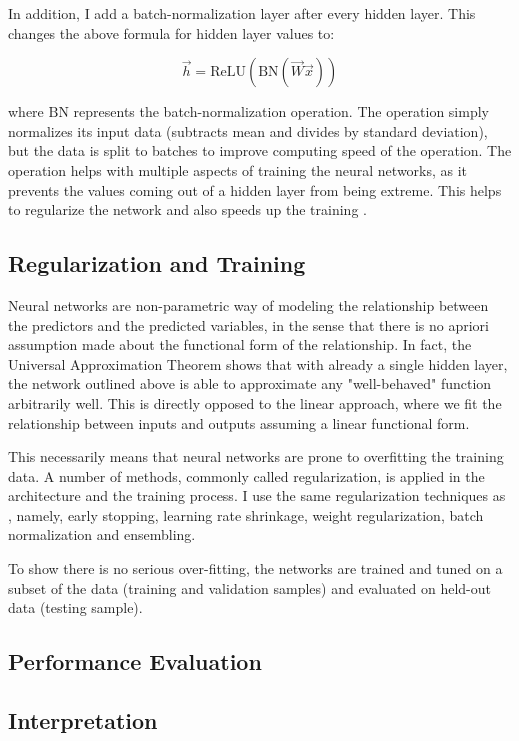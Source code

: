 	In addition, I add a batch-normalization layer \citep{ioffe2015batch} after every hidden layer. This changes the above formula for hidden layer values to: 
	
	\begin{equation}
		\vec{h} = \text{ReLU}(\text{BN}(\vec{W}\vec{x}))
	\end{equation}
	
	where $\text{BN}$ represents the batch-normalization operation. The operation simply normalizes its input data (subtracts mean and divides by standard deviation), but the data is split to batches to improve computing speed of the operation. The operation helps with multiple aspects of training the neural networks, as it prevents the values coming out of a hidden layer from being extreme. This helps to regularize the network and also speeds up the training \citep{ioffe2015batch}. 
	
	
	\subsection{Regularization and Training}
	
	Neural networks are non-parametric way of modeling the relationship between the predictors and the predicted variables, in the sense that there is no apriori assumption made about the functional form of the relationship. In fact, the Universal Approximation Theorem shows that with already a single hidden layer, the network outlined above is able to approximate any "well-behaved" function arbitrarily well. This is directly opposed to the linear approach, where we fit the relationship between inputs and outputs assuming a linear functional form. 
	
	This necessarily means that neural networks are prone to overfitting the training data. A number of methods, commonly called regularization, is applied in the architecture and the training process. I use the same regularization techniques as \cite{gu2020empirical}, namely, early stopping, learning rate shrinkage, weight regularization, batch normalization and ensembling.  
	
	To show there is no serious over-fitting, the networks are trained and tuned on a subset of the data (training and validation samples) and evaluated on held-out data (testing sample).
	
	\subsection{Performance Evaluation}
	
	\subsection{Interpretation}
	

	

	
	


